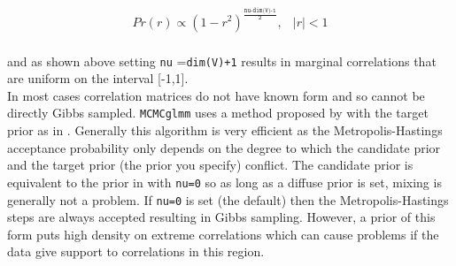 \documentclass{article}
\begin{document}
\begin{equation}
\begin{array}{lr}
Pr(r) \propto (1-r^{2})^\frac{\texttt{nu-dim(V)-1}}{\texttt{2}}, & |r|<1\\
\end{array}
\end{equation}

and as shown above setting \texttt{nu} =\texttt{dim(V)+1} results in marginal correlations that are uniform on the interval [-1,1].\\

In most cases correlation matrices do not have known form and so cannot be directly Gibbs sampled. \texttt{MCMCglmm} uses a method proposed by \citet{Liu.2006} with the target prior as in \citet{Barnard.2000}.  Generally this algorithm is very efficient as the Metropolis-Hastings acceptance probability only depends on the degree to which the candidate prior  and the target prior (the prior you specify) conflict. The candidate prior is equivalent to the prior  in \citet{Barnard.2000} with \texttt{nu=0} so as long as a diffuse prior is set, mixing is generally not a problem. If  \texttt{nu=0} is set (the default) then the Metropolis-Hastings steps are always accepted resulting in Gibbs sampling. However, a prior of this form puts high density on extreme correlations which can cause problems if the data give support to correlations in this region.\\ 

\label{VCVprior-sec}
\ifalone
\end{document}

